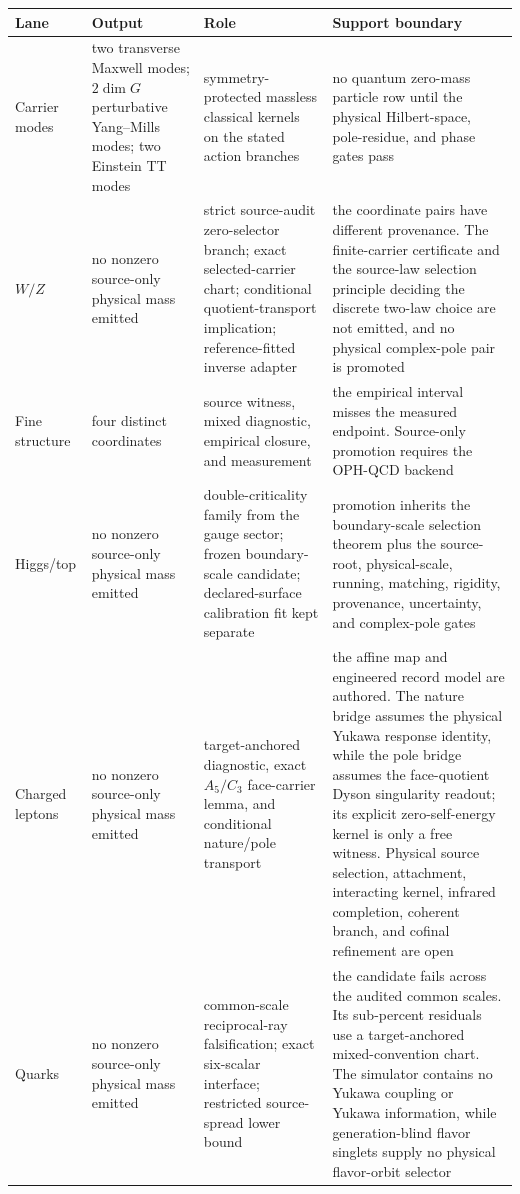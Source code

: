 \documentclass[11pt]{article}
\begin{document}
\begin{table}[h]
\centering
\scriptsize
\setlength{\tabcolsep}{3pt}
\begin{tabular}{@{}>{\raggedright\arraybackslash}p{}>{\raggedright\arraybackslash}p{}>{\raggedright\arraybackslash}p{}>{\raggedright\arraybackslash}p{}@{}}
\toprule
Lane & Output & Role & Support boundary \\
\midrule
Carrier modes & two transverse Maxwell modes; \(2\dim G\) perturbative Yang--Mills modes; two Einstein TT modes & symmetry-protected massless classical kernels on the stated action branches & no quantum zero-mass particle row until the physical Hilbert-space, pole-residue, and phase gates pass \\
\(W/Z\) & no nonzero source-only physical mass emitted & strict source-audit zero-selector branch; exact selected-carrier chart; conditional quotient-transport implication; reference-fitted inverse adapter & the coordinate pairs have different provenance. The finite-carrier certificate and the source-law selection principle deciding the discrete two-law choice are not emitted, and no physical complex-pole pair is promoted \\
Fine structure & four distinct coordinates & source witness, mixed diagnostic, empirical closure, and measurement & the empirical interval misses the measured endpoint. Source-only promotion requires the OPH-QCD backend \\
Higgs/top & no nonzero source-only physical mass emitted & double-criticality family from the gauge sector; frozen boundary-scale candidate; declared-surface calibration fit kept separate & promotion inherits the boundary-scale selection theorem plus the source-root, physical-scale, running, matching, rigidity, provenance, uncertainty, and complex-pole gates \\
Charged leptons & no nonzero source-only physical mass emitted & target-anchored diagnostic, exact \(A_5/C_3\) face-carrier lemma, and conditional nature/pole transport & the affine map and engineered record model are authored. The nature bridge assumes the physical Yukawa response identity, while the pole bridge assumes the face-quotient Dyson singularity readout; its explicit zero-self-energy kernel is only a free witness. Physical source selection, attachment, interacting kernel, infrared completion, coherent branch, and cofinal refinement are open \\
Quarks & no nonzero source-only physical mass emitted & common-scale reciprocal-ray falsification; exact six-scalar interface; restricted source-spread lower bound & the candidate fails across the audited common scales. Its sub-percent residuals use a target-anchored mixed-convention chart. The simulator contains no Yukawa coupling or Yukawa information, while generation-blind flavor singlets supply no physical flavor-orbit selector \\

\end{tabular}
\end{table}
\end{document}
